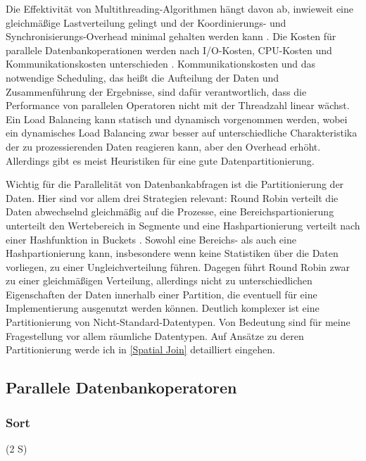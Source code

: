 \documentclass[a4paper,12pt,twoside]{article}
\begin{document}
{Die Effektivität von Multithreading-Algorithmen hängt davon ab, inwieweit eine gleichmäßige Lastverteilung gelingt und der Koordinierungs- und Synchronisierungs-Overhead minimal gehalten werden kann \parencite{Lakshmi1990}. Die Kosten für parallele Datenbankoperationen werden nach I/O-Kosten, CPU-Kosten und Kommunikationskosten unterschieden \parencite [S. 23]{Yu1998}. Kommunikationskosten und das notwendige Scheduling, das heißt die Aufteilung der Daten und Zusammenführung der Ergebnisse, sind dafür verantwortlich, dass die Performance von parallelen Operatoren nicht mit der Threadzahl linear wächst. Ein Load Balancing kann statisch und dynamisch vorgenommen werden, wobei ein dynamisches Load Balancing zwar besser auf unterschiedliche Charakteristika der zu prozessierenden Daten reagieren kann, aber den Overhead erhöht. Allerdings gibt es meist Heuristiken für eine gute Datenpartitionierung.

Wichtig für die Parallelität von Datenbankabfragen ist die Partitionierung der Daten. Hier sind vor allem drei Strategien relevant: Round Robin verteilt die Daten abwechselnd gleichmäßig auf die Prozesse, eine Bereichspartionierung unterteilt den Wertebereich in Segmente und eine Hashpartionierung verteilt nach einer Hashfunktion in Buckets \parencite{Yu1998}. Sowohl eine Bereichs- als auch eine Hashpartionierung kann, insbesondere wenn keine Statistiken über die Daten vorliegen, zu einer Ungleichverteilung führen. Dagegen führt Round Robin zwar zu einer gleichmäßigen Verteilung, allerdings nicht zu unterschiedlichen Eigenschaften der Daten innerhalb einer Partition, die eventuell für eine Implementierung ausgenutzt werden können. Deutlich komplexer ist eine Partitionierung von Nicht-Standard-Datentypen. Von Bedeutung sind für meine Fragestellung vor allem räumliche Datentypen. Auf Ansätze zu deren Partitionierung werde ich in \autoref{Spatial Join} detailliert eingehen. 


\subsection{Parallele Datenbankoperatoren}

\subsubsection{Sort} (2 S)
\label{Sort} 

}
\end{document}
